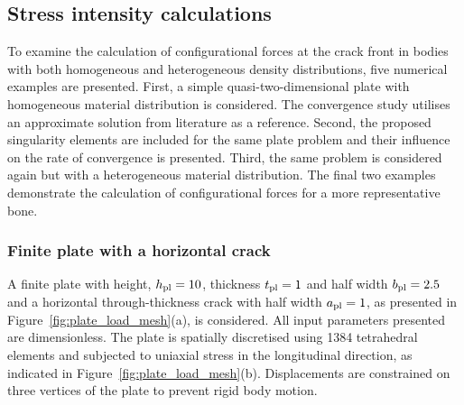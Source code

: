 \documentclass[onecolumn]{svjour3}
\begin{document}
% 


\subsection{Stress intensity calculations}
\label{sec:release_energy_rate}
To examine the calculation of configurational forces at the crack front in bodies with both homogeneous and heterogeneous density distributions, five numerical examples are presented.
First, a simple quasi-two-dimensional plate with homogeneous material distribution is considered.  The convergence study utilises an approximate solution from literature as a reference.
Second, the proposed singularity elements are included for the same plate problem and their influence on the rate of convergence is presented. 
Third, the same problem is considered again but with a heterogeneous material distribution.
The final two examples demonstrate the calculation of configurational forces for a more representative bone.
 
\subsubsection{Finite plate with a horizontal crack}\label{sec:plate_section}
A finite plate with height, $h_{\rm {pl}} = 10$, thickness $t_{\rm {pl}}=1$ and half width $b_{\rm{pl}} = 2.5$ and a horizontal through-thickness crack with half width $a_{\rm {pl}} = 1$, as presented in Figure~\ref{fig:plate_load_mesh}(a), is considered. All input parameters presented are dimensionless. 
The  plate is spatially discretised using 1384 tetrahedral elements and subjected to uniaxial stress in the longitudinal direction, as indicated in Figure~\ref{fig:plate_load_mesh}(b). 
Displacements are constrained on three vertices of the plate to prevent rigid body motion. 
\end{document}
